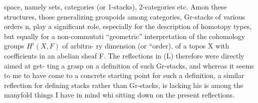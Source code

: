 
space, namely sets, categories (or 1-stacks), 2-categories etc. Amon
these structures, those generalizing groupoids among categories, 
Gr-stacks of various orders n, play a significant role, especially
for the description of homotopy types, but equally for a non-commutati
``geometric'' interpretation of the cohomology groups $H^i(X,F)$ of arbitra-%
ry dimension (or ``order), of a topos X with coefficients in an abelian
sheaf F. The reflections in (L) therefore were directly aimed at get-%
ting a grasp on a definition of such Gr-stacks, and whereas it seems to
me to have come to a concrete starting point for such a definition, a
similar reflection for defining  stacks  rather than Gr-stacks,
is  lacking  his is  among the manyfold things I have in mind whi
sitting down on the present reflections.

